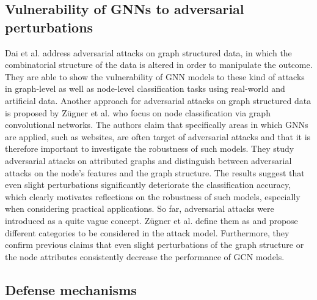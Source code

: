 \documentclass[a4paper,preprint]{sig-alternate}
\begin{document}
\vfill
\pagebreak

\subsection{Vulnerability of GNNs to adversarial perturbations}
\label{sec:rev1}

Dai et al. \cite{Dai_2018} address adversarial attacks on graph structured data, in which the combinatorial structure of 
the data is altered in order to manipulate the outcome. They are able to show the vulnerability of GNN models to these kind of attacks
in graph-level as well as node-level classification tasks using real-world and artificial data.\newline
Another approach for adversarial attacks on graph structured data is proposed by Zügner et al. \cite{Zuegner_2018} who focus on node classification
via graph convolutional networks. The authors claim that specifically areas in which GNNs are applied, such as websites, are often target of
adversarial attacks and that it is therefore important to investigate the robustness of such models. They study adversarial attacks on attributed graphs 
and distinguish between adversarial attacks on the node's features and the graph structure.
The results suggest that even slight perturbations significantly deteriorate the classification accuracy, which clearly motivates reflections
on the robustness of such models, especially when considering practical applications.\newline
So far, adversarial attacks were introduced as a quite vague concept. Zügner et al. \cite{zuegner2019adversarial}
define them as 
and propose different categories to be considered in the attack model. Furthermore, they confirm previous claims that 
even slight perturbations of the graph structure or the node attributes consistently decrease the performance of GCN models.

\subsection{Defense mechanisms}
\label{sec:rev2}
\end{document}
